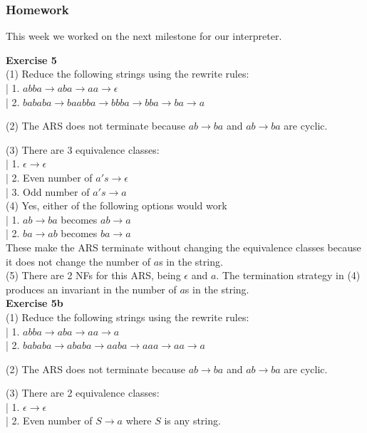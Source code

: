 \documentclass{article}
\theoremstyle{theorem}
\theoremstyle{definition}
\theoremstyle{remark}
\begin{document}
\subsubsection*{Homework} This week we worked on the next milestone for our interpreter.

\textbf{Exercise 5}\\

(1) Reduce the following strings using the rewrite rules:\\
|    1. $abba \rightarrow aba \rightarrow aa \rightarrow \epsilon$\\
|    2. $bababa \rightarrow baabba \rightarrow bbba \rightarrow bba \rightarrow ba \rightarrow a$

(2) The ARS does not terminate because $ab \rightarrow ba$ and $ab \rightarrow ba$ are cyclic.

(3) There are 3 equivalence classes:\\
|    1. $\epsilon \rightarrow \epsilon$\\
|    2. Even number of $a's \rightarrow \epsilon$\\
|    3. Odd number of $a's \rightarrow a$\\

(4) Yes, either of the following options would work\\
|    1. $ab \rightarrow ba$ becomes $ab \rightarrow a$\\
|    2. $ba \rightarrow ab$ becomes $ba \rightarrow a$\\
These make the ARS terminate without changing the equivalence classes because it does not change the number of $a$s in the string.\\

(5) There are 2 NFs for this ARS, being $\epsilon$ and $a$. The termination strategy in (4) produces an invariant in the number of $a$s in the string.\\

  \textbf{Exercise 5b}\\

  (1) Reduce the following strings using the rewrite rules:\\
    |    1. $abba \rightarrow aba \rightarrow aa \rightarrow a$\\
    |    2. $bababa \rightarrow ababa \rightarrow aaba \rightarrow aaa \rightarrow aa \rightarrow a$

  (2) The ARS does not terminate because $ab \rightarrow ba$ and $ab \rightarrow ba$ are cyclic.

  (3) There are 2 equivalence classes:\\
    |    1. $\epsilon \rightarrow \epsilon$\\
    |    2. Even number of $S \rightarrow a$ where $S$ is any string.\\
\end{document}
